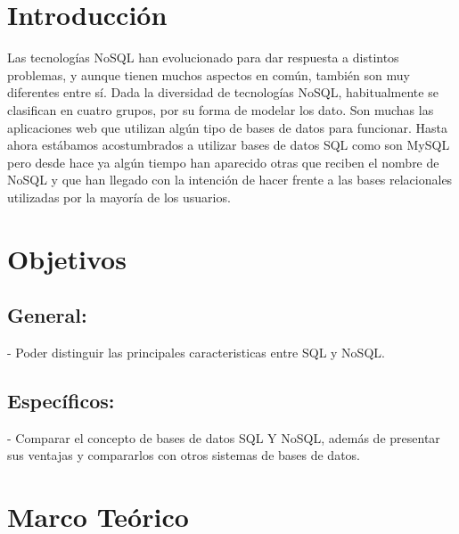 \documentclass[%
 reprint,
 amsmath,amssymb,
 aps,
]{revtex4-1}
\begin{document}
\section {Introducción}\label{sec:1}
Las tecnologías NoSQL han evolucionado para dar respuesta a distintos problemas, y aunque tienen muchos aspectos en común, también son muy diferentes entre sí. Dada la diversidad de tecnologías NoSQL, habitualmente se clasifican en cuatro grupos, por su forma de modelar los dato.
Son muchas las aplicaciones web que utilizan algún tipo de bases de datos para funcionar. Hasta ahora estábamos acostumbrados a utilizar bases de datos SQL como son MySQL pero desde hace ya algún tiempo han aparecido otras que reciben el nombre de NoSQL  y que han llegado con la intención de hacer frente a las bases relacionales utilizadas por la mayoría de los usuarios.



\section{Objetivos}\label{sec:2}
\subsection{General:}
-  Poder distinguir las principales caracteristicas  entre  SQL y  NoSQL.
\subsection{Específicos:}
-  Comparar el concepto de bases de datos SQL Y  NoSQL, además de presentar sus ventajas y compararlos con otros sistemas de bases de datos.


\section {Marco Teórico}\label{sec:3}
\end{document}
